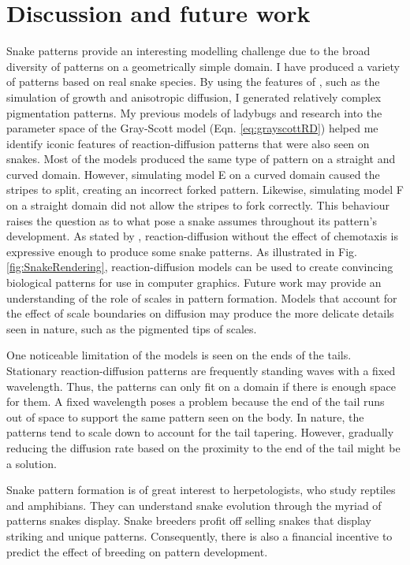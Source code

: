 \newpage

\section{Discussion and future work}
Snake patterns provide an interesting modelling challenge due to the broad diversity of patterns on a geometrically simple domain. I have produced a variety of patterns based on real snake species. By using the features of \ProgramName{}, such as the simulation of growth and anisotropic diffusion, I generated relatively complex pigmentation patterns. My previous models of ladybugs and research into the parameter space of the Gray-Scott model (Eqn. \ref{eq:grayscottRD}) helped me identify iconic features of reaction-diffusion patterns that were also seen on snakes. Most of the models produced the same type of pattern on a straight and curved domain. However, simulating model E on a curved domain caused the stripes to split, creating an incorrect forked pattern. Likewise, simulating model F on a straight domain did not allow the stripes to fork correctly. This behaviour raises the question as to what pose a snake assumes throughout its pattern's development. As stated by \citet{murray1991}, reaction-diffusion without the effect of chemotaxis is expressive enough to produce some snake patterns. As illustrated in Fig. \ref{fig:SnakeRendering}, reaction-diffusion models can be used to create convincing biological patterns for use in computer graphics. Future work may provide an understanding of the role of scales in pattern formation. Models that account for the effect of scale boundaries on diffusion may produce the more delicate details seen in nature, such as the pigmented tips of scales. 

One noticeable limitation of the models is seen on the ends of the tails. Stationary reaction-diffusion patterns are frequently standing waves with a fixed wavelength. Thus, the patterns can only fit on a domain if there is enough space for them. A  fixed wavelength poses a problem because the end of the tail runs out of space to support the same pattern seen on the body. In nature, the patterns tend to scale down to account for the tail tapering. However, gradually reducing the diffusion rate based on the proximity to the end of the tail might be a solution.

Snake pattern formation is of great interest to herpetologists, who study reptiles and amphibians. They can understand snake evolution through the myriad of patterns snakes display. Snake breeders profit off selling snakes that display striking and unique patterns. Consequently, there is also a financial incentive to predict the effect of breeding on pattern development.

